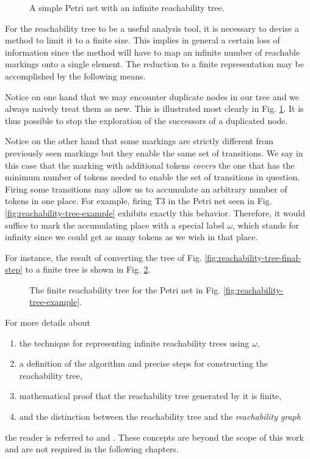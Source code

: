 \begin{figure}[!htb]
      \centering
      
      \caption{A simple Petri net with an infinite reachability tree.}
      \label{fig:reachability-tree-bounded-net-counterexample}
\end{figure}

For the reachability tree to be a useful analysis tool,
it is necessary to devise a method to limit it to a finite size.
This implies in general a certain loss of information since the method will have to map
an infinite number of reachable markings onto a single element.
The reduction to a finite representation may be accomplished by the following means.

Notice on one hand that we may encounter duplicate nodes
in our tree and we always naively treat them as new.
This is illustrated most clearly in Fig. \ref{fig:reachability-tree-bounded-net-counterexample}.
It is thus possible to stop the exploration of the successors of a duplicated node.

Notice on the other hand that some markings are strictly different from previously seen markings
but they enable the same set of transitions.
We say in this case that the marking with additional tokens \emph{covers} the one
that has the minimum number of tokens needed to enable the set of transitions in question.
Firing some transitions may allow us to accumulate an arbitrary number of tokens in one place.
For example, firing T3 in the Petri net seen in
Fig. \ref{fig:reachability-tree-example} exhibits exactly this behavior.
Therefore, it would suffice to mark the accumulating place
with a special label $\omega$, which stands for infinity
since we could get as many tokens as we wish in that place.

For instance, the result of converting the tree of Fig. \ref{fig:reachability-tree-final-step}
to a finite tree is shown in Fig. \ref{fig:reachability-tree-final-step-finite}.

\begin{figure}[!htb]
      \centering
      
      \caption{The finite reachability tree for the Petri net in Fig.
            \ref{fig:reachability-tree-example}.}
      \label{fig:reachability-tree-final-step-finite}
\end{figure}

For more details about

\begin{enumerate}
      \item the technique for representing infinite reachability trees using $\omega$,
      \item a definition of the algorithm and precise steps for constructing the reachability tree,
      \item mathematical proof that the reachability tree generated by it is finite,
      \item and the distinction between the reachability tree and the \emph{reachability graph}
\end{enumerate}

the reader is referred to \cite{murata1989} and \cite{peterson1981}.
These concepts are beyond the scope of this work
and are not required in the following chapters.